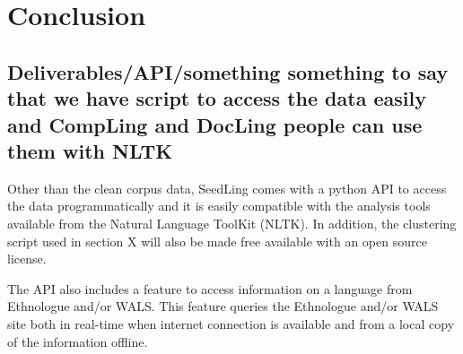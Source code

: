 \newpage
\section{Conclusion}
\subsection{Deliverables/API/something something to say that we have script to access the data easily and CompLing and DocLing people can use them with NLTK}
Other than the clean corpus data, SeedLing comes with a python API to access the data programmatically and it is easily compatible with the analysis tools available from the Natural Language ToolKit (NLTK). In addition, the clustering script used in section X will also be made free available with an open source license.

The API also includes a feature to access information on a language from Ethnologue and/or WALS. This feature queries the Ethnologue and/or WALS site both in real-time when internet connection is available and from a local copy of the information offline. 

%
